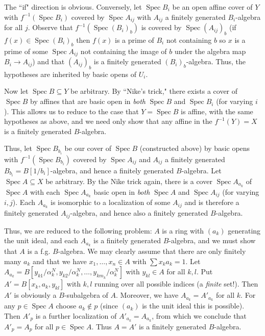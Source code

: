 \documentclass{report}
\DeclareMathOperator{\Spec}{Spec}
\begin{document}
\bigskip
{}	The ``if" direction is obvious.  Conversely, let $\Spec B_i$ be an open affine cover of $Y$
with $f^{-1}(\Spec B_i)$ covered by $\Spec A_{ij}$ with $A_{ij}$ a finitely generated $B_i$-algebra
for all $j$.  Observe that $f^{-1}(\Spec (B_i)_b)$ is covered by $\Spec (A_{ij})_b$
(if $f(x)\in\Spec (B_i)_b$ then $f(x)$ is a prime of $B_i$ not containing $b$ so $x$ is a prime of some $\Spec A_{ij}$
not containing the image of $b$ under the algebra map $B_i\rightarrow A_{ij}$) and that
$(A_{ij})_b$ is a finitely generated $(B_i)_b$-algebra.  Thus, the hypotheses are inherited by basic opens
of $U_i$.	

Now let $\Spec B\subseteq Y$ be arbitrary.  By ``Nike's trick," there exists a cover of $\Spec B$ by affines
that are basic open in {\em both} $\Spec B$ and $\Spec B_i$ (for varying $i$).
This allows us to reduce to the case that $Y=\Spec B$ is affine, with the same hypotheses
as above, and we need only show that any affine in the $f^{-1}(Y)=X$ is a finitely generated $B$-algebra.

Thus, let $\Spec B_{b_i}$ be our cover of $\Spec B$ (constructed above)
by basic opens with $f^{-1}(\Spec B_{b_i})$ covered by $\Spec A_{ij}$
and $A_{ij}$ a finitely generated $B_{b_i}=B[1/b_i]$-algebra, and hence a finitely generated $B$-algebra.
Let $\Spec A\subseteq X$ be arbitrary.  By the Nike trick again, there is a cover
$\Spec A_{a_k}$ of $\Spec A$ with each $\Spec A_{a_k}$ basic open in {\em both} $\Spec A$ and $\Spec A_{ij}$
(for varying $i,j$).  Each $A_{a_k}$ is isomorphic to a localization of some $A_{ij}$ and is therefore a finitely generated
$A_{ij}$-algebra, and hence also a finitely generated $B$-algebra.

Thus, we are reduced to the following problem: $A$ is a ring with $(a_k)$ generating the unit ideal, and each
$A_{a_k}$ is a finitely generated $B$-algebra, and we must show that $A$ is a f.g. $B$-algebra.
 We may clearly assume that there are only finitely many $a_k$ and that we have $x_1,\ldots,x_n\in A$
 with $\sum x_ka_k=1$.
 Let $A_{a_k}=B[y_{k1}/\alpha_{k}^N,y_{k2}/\alpha_k^N,\ldots,y_{k m_k}/\alpha_k^N]$ with $y_{kl}\in A$ for all $k,l$.
 Put $A'=B[x_k,a_k,y_{kl}]$ with $k,l$ running over all possible indices (a {\em finite} set!).  Then $A'$ is obviously
 a $B$-subalgebra of $A$.  Moreover, we have $A_{a_k}=A'_{a_k}$ for all $k$.  For any $p\in\Spec A$ choose $a_k\not\in p$
 (since $(a_k)$ is the unit ideal this is possible).  Then $A'_{p}$ is a further localization of $A'_{a_k}=A_{a_k}$, from which
 we conclude that $A'_p=A_p$ for all $p\in\Spec A$.  Thus $A=A'$ is a finitely generated $B$-algebra.
  
\end{document}

